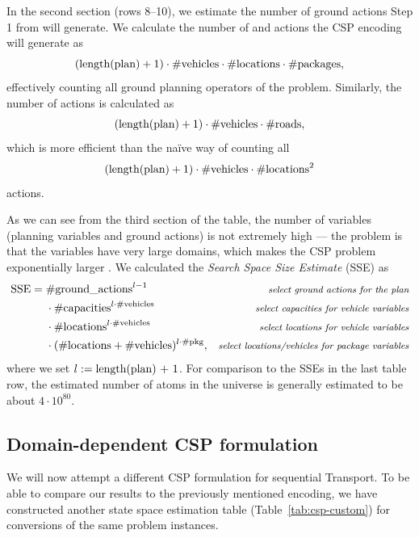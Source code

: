 In the second section (rows 8--10), we estimate the number of ground actions
Step 1 from \citet[Section~8.3.1]{Ghallab2004} will generate.
We calculate the number of \pickup{} and \drop{} actions the CSP encoding will generate
as $$(\textrm{length(plan)} + 1) \cdot \textrm{\#vehicles} \cdot \textrm{\#locations} \cdot \textrm{\#packages},$$
effectively counting all ground planning operators of the problem. Similarly,
the number of \drive{} actions is calculated as
$$(\textrm{length(plan)} + 1) \cdot \textrm{\#vehicles} \cdot \textrm{\#roads},$$
which is more efficient than the na{\"{i}}ve way of
counting all
$$(\textrm{length(plan)} + 1) \cdot \textrm{\#vehicles} \cdot \textrm{\#locations}^2$$
actions.

As we can see from the third section of the table, the number of variables
(planning variables and ground actions) is not extremely high
--- the problem is that the variables have very large domains,
which makes the CSP problem exponentially larger \citep[Section~8.3.2]{Ghallab2004}.
We calculated the \textit{Search Space Size Estimate} (SSE) as
\begin{align*}
\textrm{SSE} =\; &\textrm{\#ground\_actions}^{l-1} & \textit{\footnotesize select ground actions for the plan}\\
&\cdot \textrm{\#capacities}^{l \cdot \textrm{\#vehicles}} & \textit{\footnotesize select capacities for vehicle variables}\\
&\cdot \textrm{\#locations}^{l \cdot \textrm{\#vehicles}} & \textit{\footnotesize select locations for vehicle variables}\\
&\cdot (\textrm{\#locations} + \textrm{\#vehicles})^{l \cdot \textrm{\#pkg}}, & \textit{\footnotesize select locations/vehicles for package variables}
\end{align*}
where we set $l := \textrm{length(plan) + 1}$.
For comparison to the SSEs in the last table row, 
the estimated number of atoms in the universe is generally estimated to be about $4 \cdot 10^{80}$.

\subsection{Domain-dependent CSP formulation}\label{csp-custom-repr}

We will now attempt a different CSP formulation for sequential Transport.
To be able to compare our results to the previously mentioned encoding, we have constructed another state space estimation table (Table~\ref{tab:csp-custom}) for conversions of the same problem instances.

